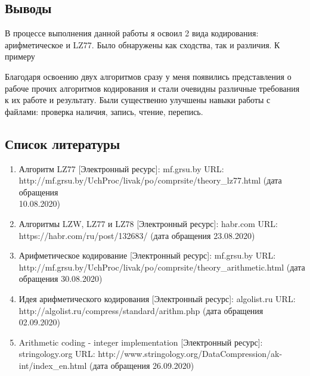 \documentclass[12pt]{article}
\begin{document}
\subsection*{Выводы}%

В процессе выполнения данной работы я освоил 2 вида кодирования: арифметическое и LZ77. Было обнаружены как сходства, так и различия. К примеру%

Благодаря освоению двух алгоритмов сразу у меня появились представления о рабоче прочих алгоритмов кодирования и стали очевидны различные требования к их работе и результату. Были существенно улучшены навыки работы с файлами: проверка наличия, запись, чтение, перепись.

\subsection*{Список литературы}
\begin{enumerate}
	\item Алгоритм LZ77 [Электронный ресурс]: mf.grsu.by URL:\\ http://mf.grsu.by/UchProc/livak/po/comprsite/theory\_lz77.html (дата обращения\\ 10.08.2020)
	\item Алгоритмы LZW, LZ77 и LZ78 [Электронный ресурс]: habr.com URL:\\ https://habr.com/ru/post/132683/ (дата обращения 23.08.2020)
	\item Арифметическое кодирование [Электронный ресурс]: mf.grsu.by URL:\\ http://mf.grsu.by/UchProc/livak/po/comprsite/theory\_arithmetic.html (дата обращения 30.08.2020)
	\item Идея арифметического кодирования [Электронный ресурс]: algolist.ru URL:\\ http://algolist.ru/compress/standard/arithm.php (дата обращения 02.09.2020)
	\item Arithmetic coding - integer implementation [Электронный ресурс]: stringology.org URL: http://www.stringology.org/DataCompression/ak-int/index\_en.html (дата обращения 26.09.2020)
\end{enumerate}
\end{document}
